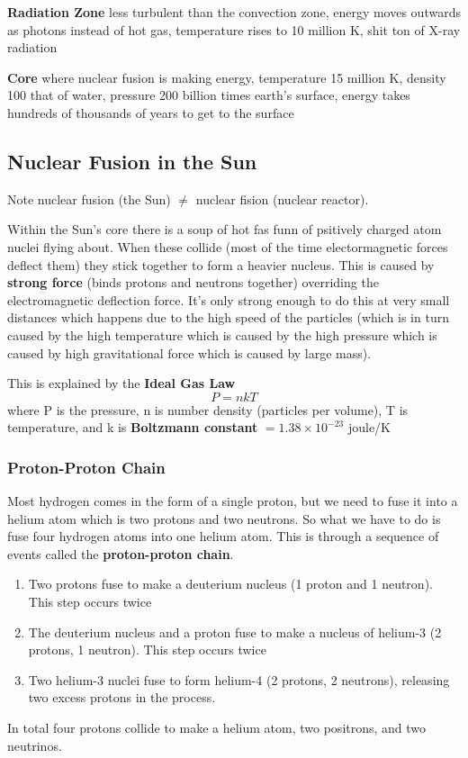 \textbf{Radiation Zone} less turbulent than the convection zone, energy moves outwards as photons instead of hot gas, temperature rises to 10 million K, shit ton of X-ray radiation

\textbf{Core} where nuclear fusion is making energy, temperature 15 million K, density 100 that of water, pressure 200 billion times earth's surface, energy takes hundreds of thousands of years to get to the surface

\subsection{Nuclear Fusion in the Sun}
Note nuclear fusion (the Sun) $\not =$ nuclear fision (nuclear reactor).

Within the Sun's core there is a soup of hot fas funn of psitively charged atom nuclei flying about. When these collide (most of the time electormagnetic forces deflect them) they stick together to form a heavier nucleus. This is caused by \textbf{strong force} (binds protons and neutrons together) overriding the electromagnetic deflection force. It's only strong enough to do this at very small distances which happens due to the high speed of the particles (which is in turn caused by the high temperature which is caused by the high pressure which is caused by high gravitational force which is caused by large mass).

This is explained by the \textbf{Ideal Gas Law} \[ P = nkT \] where P is the pressure, n is number density (particles per volume), T is temperature, and k is \textbf{Boltzmann constant} $=1.38 \times 10^{-23}$ joule/K

\subsubsection{Proton-Proton Chain}
Most hydrogen comes in the form of a single proton, but we need to fuse it into a helium atom which is two protons and two neutrons. So what we have to do is fuse four hydrogen atoms into one helium atom. This is through a sequence of events called the \textbf{proton-proton chain}.
\begin{enumerate}
\item Two protons fuse to make a deuterium nucleus (1 proton and 1 neutron). This step occurs twice
\item The deuterium nucleus and a proton fuse to make a nucleus of helium-3 (2 protons, 1 neutron). This step occurs twice
\item Two helium-3 nuclei fuse to form helium-4 (2 protons, 2 neutrons), releasing two excess protons in the process.
\end{enumerate}
In total four protons collide to make a helium atom, two positrons, and two neutrinos.

